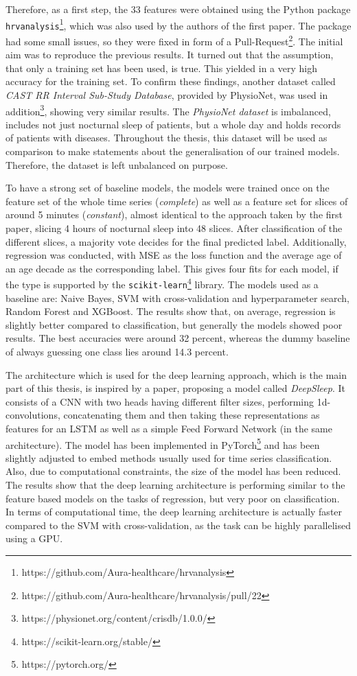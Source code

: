 \documentclass[11pt]{scrartcl}
\begin{document}
Therefore, as a first step, the 33 features were obtained using the Python package \texttt{hrvanalysis}\footnote{https://github.com/Aura-healthcare/hrvanalysis}, which was also used by the authors of the first paper. The package had some small issues, so they were fixed in form of a Pull-Request\footnote{https://github.com/Aura-healthcare/hrvanalysis/pull/22}. The initial aim was to reproduce the previous results. It turned out that the assumption, that only a training set has been used, is true. This yielded in a very high accuracy for the training set. To confirm these findings, another dataset called \textit{CAST RR Interval Sub-Study Database}, provided by PhysioNet, was used in addition\footnote{https://physionet.org/content/crisdb/1.0.0/}, showing very similar results. The \textit{PhysioNet dataset} is imbalanced, includes not just nocturnal sleep of patients, but a whole day and holds records of patients with diseases. Throughout the thesis, this dataset will be used as comparison to make statements about the generalisation of our trained models. Therefore, the dataset is left unbalanced on purpose.

To have a strong set of baseline models, the models were trained once on the feature set of the whole time series (\textit{complete}) as well as a feature set for slices of around 5 minutes (\textit{constant}), almost identical to the approach taken by the first paper, slicing 4 hours of nocturnal sleep into 48 slices. After classification of the different slices, a majority vote decides for the final predicted label. Additionally, regression was conducted, with MSE as the loss function and the average age of an age decade as the corresponding label. This gives four fits for each model, if the type is supported by the \texttt{scikit-learn}\footnote{https://scikit-learn.org/stable/} library. The models used as a baseline are: Naive Bayes, SVM with cross-validation and hyperparameter search, Random Forest and XGBoost. The results show that, on average, regression is slightly better compared to classification, but generally the models showed poor results. The best accuracies were around 32 percent, whereas the dummy baseline of always guessing one class lies around 14.3 percent.

The architecture which is used for the deep learning approach, which is the main part of this thesis, is inspired by a paper, proposing a model called \textit{DeepSleep}. It consists of a CNN with two heads having different filter sizes, performing 1d-convolutions, concatenating them and then taking these representations as features for an LSTM as well as a simple Feed Forward Network (in the same architecture). The model has been implemented in PyTorch\footnote{https://pytorch.org/} and has been slightly adjusted to embed methods usually used for time series classification. Also, due to computational constraints, the size of the model has been reduced. The results show that the deep learning architecture is performing similar to the feature based models on the tasks of regression, but very poor on classification. In terms of computational time, the deep learning architecture is actually faster compared to the SVM with cross-validation, as the task can be highly parallelised using a GPU.
\end{document}

